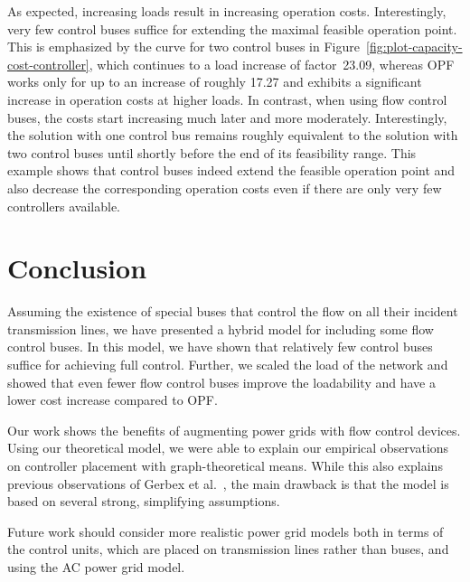 \documentclass{article}[11pt,a4paper]
\begin{document}
As expected, increasing loads result in increasing operation costs.
Interestingly, very few control buses suffice for extending the
maximal feasible operation point.  This is emphasized by the curve for
two control buses in Figure~\ref{fig:plot-capacity-cost-controller},
which continues to a load increase of factor~23.09, whereas OPF works
only for up to an increase of roughly 17.27 and exhibits a significant
increase in operation costs at higher loads.  In contrast, when using
flow control buses, the costs start increasing much later and more
moderately.  Interestingly, the solution with one control bus remains roughly
equivalent to the solution with two control buses until shortly before
the end of its feasibility range.  This example shows that control buses
indeed extend the feasible operation point and also decrease the corresponding
operation costs even if there are only very few controllers available.
\section{Conclusion}	
\label{sec:conclusion}
Assuming the existence of special buses that control the flow on all
their incident transmission lines, we have presented a hybrid model
for including some flow control buses.  In this model, we have shown
that relatively few control buses suffice for achieving full control.
Further, we scaled the load of the network and showed that even fewer
flow control buses improve the loadability and have a lower cost
increase compared to OPF.

Our work shows the benefits of augmenting power grids with flow
control devices.  Using our theoretical model, we were able to explain
our empirical observations on controller placement with
graph-theoretical means.  While this also explains previous
observations of Gerbex et al.~\cite{gcg-olmtf-01}, the main drawback
is that the model is based on several strong, simplifying assumptions.

Future work should consider more realistic power grid models both in
terms of the control units, which are placed on transmission lines
rather than buses, and using the AC power grid model.

 
\clearpage
\appendix
\end{document}
